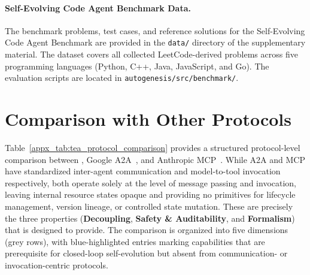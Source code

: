 \paragraph{Self-Evolving Code Agent Benchmark Data.}
The benchmark problems, test cases, and reference solutions for the Self-Evolving Code Agent Benchmark are provided in the \texttt{data/} directory of the supplementary material.
The dataset covers all collected LeetCode-derived problems across five programming languages (Python, C++, Java, JavaScript, and Go).
The evaluation scripts are located in \texttt{autogenesis/src/benchmark/}.

\section{Comparison with Other Protocols}
\label{appx_sec:comparison-with-other-protocols}

Table~\ref{appx_tab:tea_protocol_comparison} provides a structured protocol-level comparison between \projectname, Google A2A~\cite{google2025a2a}, and Anthropic MCP~\cite{anthropic2025}.
While A2A and MCP have standardized inter-agent communication and model-to-tool invocation respectively, both operate solely at the level of message passing and invocation, leaving internal resource states opaque and providing no primitives for lifecycle management, version lineage, or controlled state mutation. These are precisely the three properties (\textbf{Decoupling}, \textbf{Safety \& Auditability}, and \textbf{Formalism}) that \projectname is designed to provide.
The comparison is organized into five dimensions (grey rows), with blue-highlighted entries marking capabilities that are prerequisite for closed-loop self-evolution but absent from communication- or invocation-centric protocols.

